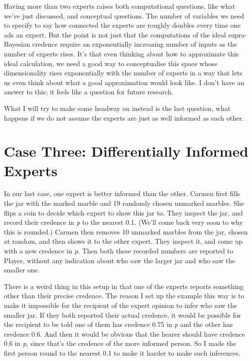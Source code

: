\documentclass[
  10pt,
  letterpaper,
  DIV=11,
  numbers=noendperiod,
  twoside]{scrartcl}
\begin{document}
Having more than two experts raises both computational questions, like
what we've just discussed, and conceptual questions. The number of
variables we need to specify to say how connected the experts are
roughly doubles every time one ads an expert. But the point is not just
that the computations of the ideal supra-Bayesian credence require an
exponentially increasing number of inputs as the number of experts
rises. It's that even thinking about how to approximate this ideal
calculation, we need a good way to conceptualise this space whose
dimensionality rises exponentially with the number of experts in a way
that lets us even think about what a good approximation would look like.
I don't have an answer to this; it feels like a question for future
research.

What I will try to make some headway on instead is the last question,
what happens if we do not assume the experts are just as well informed
as each other.

\section{Case Three: Differentially Informed
Experts}\label{case-three-differentially-informed-experts}

In our last case, one expert is better informed than the other. Carmen
first fills the jar with the marked marble and 19 randomly chosen
unmarked marbles. She flips a coin to decide which expert to show this
jar to. They inspect the jar, and record their credence in \emph{p} to
the nearest 0.1. (We'll come back very soon to why this is rounded.)
Carmen then removes 10 unmarked marbles from the jar, chosen at random,
and then shows it to the other expert. They inspect it, and come up with
a new credence in \emph{p}. Then both these recorded numbers are
reported to Player, without any indication about who saw the larger jar
and who saw the smaller one.

There is a weird thing in this setup in that one of the experts reports
something other than their precise credence. The reason I set up the
example this way is to make it impossible for the recipient of the
expert opinion to infer who saw the smaller jar. If they both reported
their actual credence, it would be possible for the recipient to be told
one of them has credence 0.75 in \emph{p} and the other has credence
0.6. And then it would be obvious that the hearer should have credence
0.6 in \emph{p}, since that's the credence of the more informed person.
So I made the first person round to the nearest 0.1 to make it harder to
make such inferences.
\end{document}
